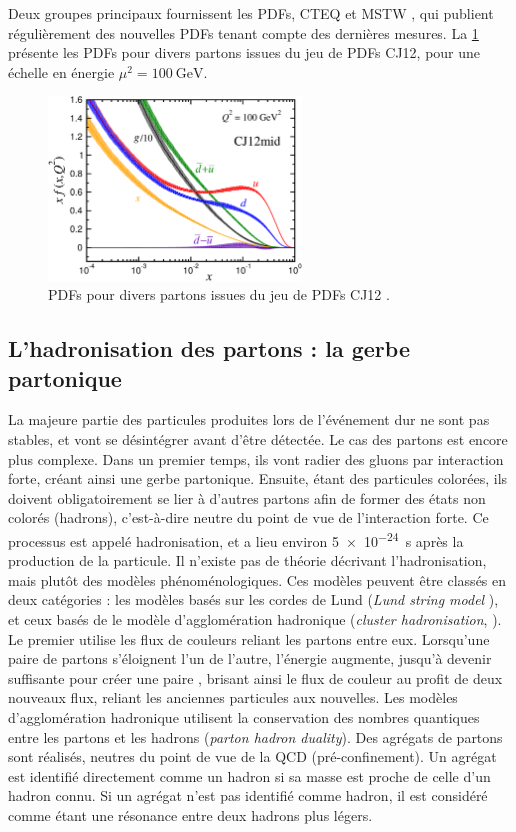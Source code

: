 \smallskip

Deux groupes principaux fournissent les PDFs, CTEQ \citep{Owens:2012bv} et MSTW \citep{Martin:2009iq}, qui publient régulièrement des nouvelles PDFs tenant compte des dernières mesures. La \cref{fig:cj12} présente les PDFs pour divers partons issues du jeu de PDFs CJ12, pour une échelle en énergie $\mu^2 = \SI{100}{\GeV}$.

\begin{figure}[tbp]
  \centering
  \includegraphics[width=0.6\textwidth]{chapitre3/figs/Fx_errl.pdf}
  \caption{PDFs pour divers partons issues du jeu de PDFs CJ12 \citep{Owens:2012bv}.}
  \label{fig:cj12}
\end{figure}


\subsection{L'hadronisation des partons : la gerbe partonique}

La majeure partie des particules produites lors de l'événement dur ne sont pas stables, et vont se désintégrer avant d'être détectée. Le cas des partons est encore plus complexe. Dans un premier temps, ils vont radier des gluons par interaction forte, créant ainsi une gerbe partonique. Ensuite, étant des particules colorées, ils doivent obligatoirement se lier à d'autres partons afin de former des états non colorés (hadrons), c'est-à-dire neutre du point de vue de l'interaction forte. Ce processus est appelé hadronisation, et a lieu environ \SI{5e-24}{\s} après la production de la particule. Il n'existe pas de théorie décrivant l'hadronisation, mais plutôt des modèles phénoménologiques. Ces modèles peuvent être classés en deux catégories : les modèles basés sur les cordes de Lund (\emph{Lund string model} \citep{Andersson198331}), et ceux basés de le modèle d'agglomération hadronique (\emph{cluster hadronisation}, \citep{cluster}). Le premier utilise les flux de couleurs reliant les partons entre eux. Lorsqu'une paire de partons s'éloignent l'un de l'autre, l'énergie augmente, jusqu'à devenir suffisante pour créer une paire \Pquark{}\APquark{}, brisant ainsi le flux de couleur au profit de deux nouveaux flux, reliant les anciennes particules aux nouvelles. Les modèles d'agglomération hadronique utilisent la conservation des nombres quantiques entre les partons et les hadrons (\emph{parton hadron duality}). Des agrégats de partons sont réalisés, neutres du point de vue de la QCD (pré-confinement). Un agrégat est identifié directement comme un hadron si sa masse est proche de celle d'un hadron connu. Si un agrégat n'est pas identifié comme hadron, il est considéré comme étant une résonance entre deux hadrons plus légers.


